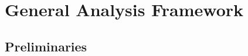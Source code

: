\section{General Analysis Framework}\label{sec:overview}

\subsection{Preliminaries}
\label{subsec:preliminaries}


